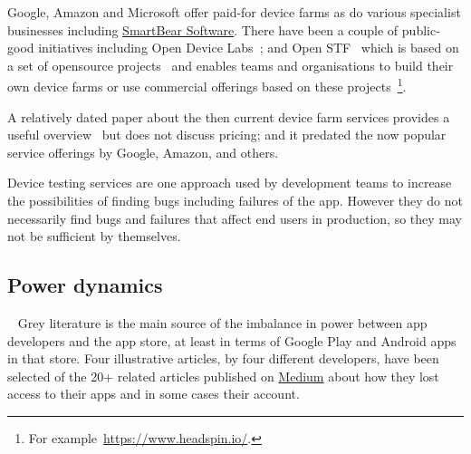 Google, Amazon and Microsoft offer paid-for device farms as do various specialist businesses including \href{https://support.smartbear.com/bitbar/docs/about-bitbar.html}{SmartBear Software}. There have been a couple of public-good initiatives including Open Device Labs~; and Open STF~ which is based on a set of opensource projects~ and enables teams and organisations to build their own device farms or use commercial offerings based on these projects~\footnote{For example~\url{https://www.headspin.io/}.}.

A relatively dated paper about the then current device farm services provides a useful overview~ but does not discuss pricing; and it predated the now popular service offerings by Google, Amazon, and others. 

Device testing services are one approach used by development teams to increase the possibilities of finding bugs including failures of the app. However they do not necessarily find bugs and failures that affect end users in production, so they may not be sufficient by themselves.


\subsection{Power dynamics}~\label{rw-power-dynamics-topic}
Grey literature is the main source of the imbalance in power between app developers and the app store, at least in terms of Google Play and Android apps in that store. Four illustrative articles, by four different developers, have been selected of the 20+ related articles published on \href{https://medium.com/}{Medium} %
about how they lost access to their apps and in some cases their account. 

